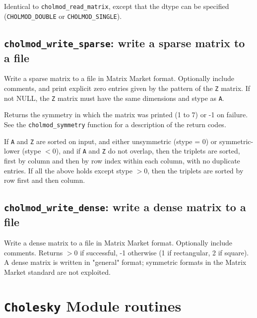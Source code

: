 \documentclass[11pt]{article}
\begin{document}

Identical to \verb'cholmod_read_matrix', except that the dtype can be
specified (\verb'CHOLMOD_DOUBLE' or \verb'CHOLMOD_SINGLE').

\subsection{{\tt cholmod\_write\_sparse}: write a sparse matrix to a file}


Write a sparse matrix to a file in Matrix Market format.   Optionally include
comments, and print explicit zero entries given by the pattern of the {\tt Z}
matrix.  If not NULL, the {\tt Z} matrix must have the same dimensions and stype
as {\tt A}.

Returns the symmetry in which the matrix was printed (1 to 7) or -1 on failure.
See the {\tt cholmod\_symmetry} function for a description of the return codes.

If {\tt A} and {\tt Z} are sorted on input, and either unsymmetric (stype = 0)
or symmetric-lower (stype $< 0$), and if {\tt A} and {\tt Z} do not overlap,
then the triplets are sorted, first by column and then by row index within each
column, with no duplicate entries.  If all the above holds except stype $> 0$,
then the triplets are sorted by row first and then column.

\subsection{{\tt cholmod\_write\_dense}: write a dense matrix to a file}


Write a dense matrix to a file in Matrix Market format.   Optionally include
comments.  Returns $> 0$ if successful, -1 otherwise (1 if rectangular, 2 if
square).  A dense matrix is written in "general" format; symmetric formats in
the Matrix Market standard are not exploited.

\newpage \section{{\tt Cholesky} Module routines}
\end{document}
